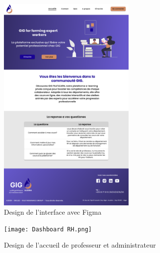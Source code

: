 \documentclass{article}
\begin{document}
\begin{figure}[H]
  \centering
  \includegraphics[width=0.6\textwidth]{homee.png}
  \caption{Design de l'interface avec Figma}
  \end{figure}

  
\begin{figure}[H]
  \centering
  \texttt{[image: Dashboard RH.png]}
  \caption{Design de l'accueil de professeur et administrateur}
  \end{figure}
\end{document}
